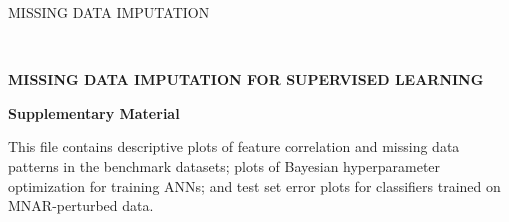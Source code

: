 \documentclass[10pt]{book}
\theoremstyle{definition}
\begin{document}
\pagestyle{empty} %

\renewcommand{\baselinestretch}{2}


{\hfill {\footnotesize\rm MISSING DATA IMPUTATION} \hfill}

\renewcommand{\thefootnote}{}
$\ $\par \fontsize{12}{14pt plus.8pt minus .6pt}\selectfont


 \centerline{\large\bf MISSING DATA IMPUTATION FOR SUPERVISED LEARNING}
\vspace{.25cm}
\vspace{.55cm}
 \centerline{\bf Supplementary Material}
\vspace{.55cm}
\fontsize{9}{11.5pt plus.8pt minus .6pt}\selectfont
\noindent
This file contains descriptive plots of feature correlation and missing data patterns in the benchmark datasets; plots of Bayesian hyperparameter optimization for training ANNs; and test set error plots for classifiers trained on MNAR-perturbed data. 
\par

\setcounter{section}{0}
\setcounter{equation}{0}
\def\theequation{S\arabic{section}.\arabic{equation}}
\def\thesection{S\arabic{section}}

\fontsize{12}{14pt plus.8pt minus .6pt}\selectfont
\end{document}
